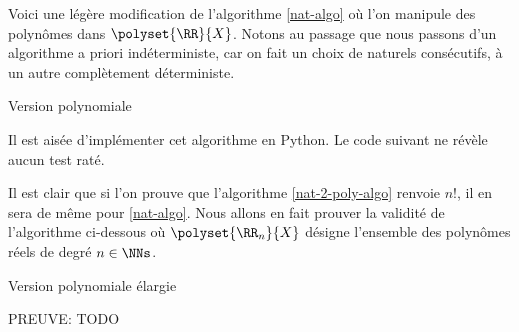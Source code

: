 Voici une légère modification de l'algorithme \ref{nat-algo} où l'on manipule des polynômes dans $\polyset{\RR}{X}$.
Notons au passage que nous passons d'un algorithme a priori indéterministe, car on fait un choix de naturels consécutifs, à un autre complètement déterministe.

\begin{algo}
	\caption{Version polynomiale} \label{nat-2-poly-algo}

	
	\addalgoblank
	
\end{algo}


Il est aisée d'implémenter cet algorithme en Python. Le code suivant ne révèle aucun test raté.

\medskip



\medskip


Il est clair que si l'on prouve que l'algorithme \ref{nat-2-poly-algo} renvoie $n!$, il en sera de même pour \ref{nat-algo}. Nous allons en fait prouver la validité de l'algorithme ci-dessous où $\polyset{\RR_{n}}{X}$ désigne l'ensemble des polynômes réels de degré $n \in \NNs$.

\medskip

\begin{algo}
	\caption{Version polynomiale élargie} \label{gene-poly-algo}

	
	\addalgoblank
	
\end{algo}


{\Huge PREUVE: TODO}


%
%
%
%
%
%
